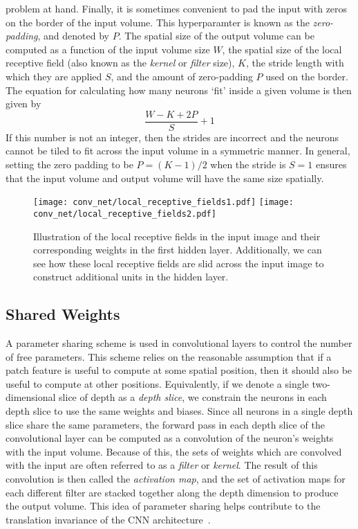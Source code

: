 \documentclass[../main.tex]{subfiles}
\begin{document}
problem at hand.
%
Finally, it is sometimes convenient to pad the input with zeros on the border
of the input volume.
%
This hyperparamter is known as the \emph{zero-padding}, and denoted by $P$.
%
The spatial size of the output volume can be computed as a function of the
input volume size $W$, the spatial size of the local receptive field (also
known as the \emph{kernel} or \emph{filter} size), $K$, the stride length with
which they are applied $S$, and the amount of zero-padding $P$ used on the
border.
%
The equation for calculating how many neurons `fit' inside a given volume is
then given by
%
\begin{equation}
  \frac{W - K + 2P}{S} + 1
\end{equation}
%
If this number is not an integer, then the strides are incorrect and the
neurons cannot be tiled to fit across the input volume in a symmetric manner.
%
In general, setting the zero padding to be $P = (K - 1) / 2$ when the stride is
$S=1$ ensures that the input volume and output volume will have the same size
spatially.
%
\begin{figure}[htpb]
  \centering
  \texttt{[image: conv\_net/local\_receptive\_fields1.pdf]}
  \hfill
  \texttt{[image: conv\_net/local\_receptive\_fields2.pdf]}
  \caption{Illustration of the local receptive fields in the input image and
    their corresponding weights in the first hidden layer. Additionally, we can
    see how these local receptive fields are slid across the input image to
    construct additional units in the hidden layer.}%
\label{fig:local_receptive_field}
\end{figure}
%
\subsection{Shared Weights}
A parameter sharing scheme is used in convolutional layers to control the
number of free parameters.
%
This scheme relies on the reasonable assumption that if a patch feature is
useful to compute at some spatial position, then it should also be useful to
compute at other positions.
%
Equivalently, if we denote a single two-dimensional slice of depth as a
\emph{depth slice}, we constrain the neurons in each depth slice to use the
same weights and biases.
%
Since all neurons in a single depth slice share the same parameters, the
forward pass in each depth slice of the convolutional layer can be computed as
a convolution of the neuron's weights with the input volume.
%
Because of this, the sets of weights which are convolved with the input are
often referred to as a \emph{filter} or \emph{kernel}.
%
The result of this convolution is then called the \emph{activation map}, and
the set of activation maps for each different filter are stacked together along
the depth dimension to produce the output volume.
%
This idea of parameter sharing helps contribute to the translation invariance
of the CNN architecture~\cite{Zhang_1990}.
%
\end{document}
